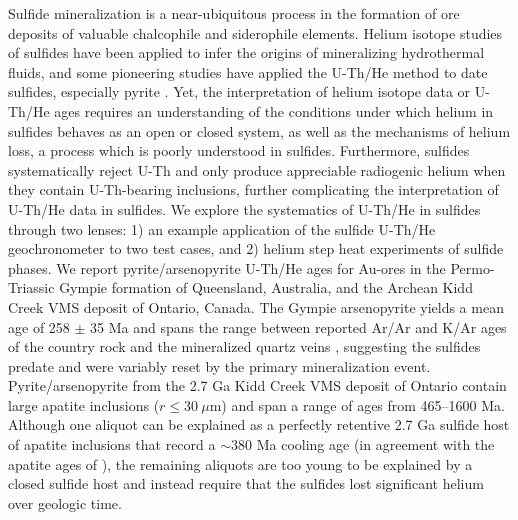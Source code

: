 %
Sulfide mineralization is a near-ubiquitous process in the formation of
ore deposits of valuable chalcophile and siderophile elements. Helium
isotope studies of sulfides have been applied to infer the origins of
mineralizing hydrothermal fluids, and some pioneering studies have
applied the U-Th/He method to date sulfides, especially pyrite
\citep{yakubovich2020,yakubovich2021}. Yet, the interpretation of helium
isotope data or U-Th/He ages requires an understanding of the conditions
under which helium in sulfides behaves as an open or closed system, as
well as the mechanisms of helium loss, a process which is poorly
understood in sulfides. Furthermore, sulfides systematically reject U-Th and only 
produce appreciable radiogenic helium when they contain U-Th-bearing inclusions, further
complicating the interpretation of U-Th/He data in sulfides. We explore the systematics of U-Th/He in
sulfides through two lenses: 1) an example application of the sulfide
U-Th/He geochronometer to two test cases, and 2)
helium step heat experiments of sulfide phases. We report
pyrite/arsenopyrite U-Th/He ages for Au-ores in the Permo-Triassic Gympie formation of
Queensland, Australia, and the Archean Kidd Creek VMS deposit of Ontario, Canada. The Gympie arsenopyrite yields a mean age of 258 $\pm$ 35 Ma and spans the range between
reported Ar/Ar and K/Ar ages of the country rock and the mineralized quartz veins \citep{holcombe1997, little1995}, suggesting the sulfides predate and were variably reset by the primary mineralization event. 
Pyrite/arsenopyrite from the 2.7 Ga Kidd Creek VMS deposit of Ontario contain large apatite inclusions ($r \leq 30~\mu$m) and span a range of ages from 465--1600 Ma. Although one aliquot can be explained as a perfectly retentive 2.7 Ga sulfide host of apatite inclusions that record a $\sim$380 Ma cooling age (in agreement with the apatite ages of \citet{sturrock2024}), the remaining aliquots are too young to be explained by a closed sulfide host and instead require that the sulfides lost significant helium over geologic time.


